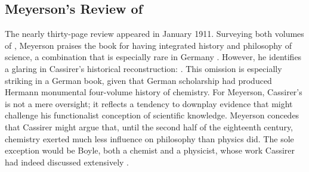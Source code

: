 \documentclass[submitted,12pt]{article}
\begin{document}


\subsection{Meyerson's Review of \EPt}

The nearly thirty-page review appeared in January 1911. Surveying both volumes of \EPt, Meyerson praises the book for having integrated history and philosophy of science, a combination that is especially rare in Germany \citep[101]{Meyerson1911}. However, he identifies a glaring  in Cassirer's historical reconstruction:  \citep[102]{Meyerson1911}. This omission is especially striking in a German book, given that German scholarship had produced Hermann  monumental four-volume history of chemistry. For Meyerson, Cassirer’s  is not a mere oversight; it reflects a tendency to downplay evidence that might challenge his functionalist conception of scientific knowledge. Meyerson concedes that Cassirer might argue that, until the second half of the eighteenth century, chemistry exerted much less influence on philosophy than physics did. The sole exception would be Boyle, both a chemist and a physicist, whose work Cassirer had indeed discussed extensively \citep[102]{Meyerson1911}.
\end{document}
